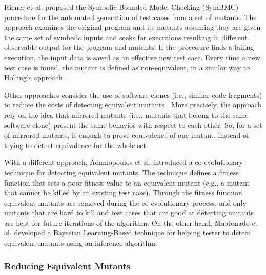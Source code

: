 Riener et al. \cite{riener2011test} proposed the Symbolic Bounded Model Checking (SymBMC) procedure for the automated generation of test cases from a set of mutants. The approach examines the original program and its mutants assuming they are given the same set of symbolic  inputs and seeks for executions resulting in different observable output for the program and mutants. If the procedure finds a failing execution, the input data is saved as an effective new test case. Every time a new test case is found, the mutant is defined as non-equivalent, in a similar way to Holling's approach \cite{holling2016nequivack}.

Other approaches consider the use of software clones (i.e., similar code fragments) to reduce the costs of detecting equivalent mutants \cite{kintis2013identifying}. More precisely, the approach rely on the idea that mirrored mutants (i.e., mutants that belong to the same software clone) present the same behavior with respect to each other. So, for a set of mirrored mutants, is enough to prove equivalence of one mutant, instead of trying to detect equivalence for the whole set.

With a different approach, Adamopoulos et al. \cite{adamopoulos2004overcome} introduced a co-evolutionary technique for detecting equivalent mutants. The technique defines a fitness function that sets a poor fitness value to an equivalent mutant (e.g., a mutant that cannot be killed by an existing test case). Through the fitness function equivalent mutants are removed during the co-evolutionary process, and only mutants that are hard to kill and test cases that are good at detecting mutants are kept for future iterations of the algorithm. On the other hand, Maldonado et al. \cite{maldonado2005bayesian} developed a Bayesian Learning-Based technique for helping tester to detect equivalent mutants using an inference algorithm.

\subsubsection{Reducing Equivalent Mutants}

